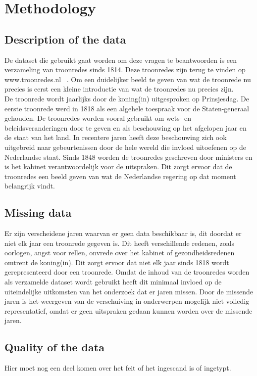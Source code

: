 \section{Methodology}
\label{sec:meth}


\subsection{Description of the data}
De dataset die gebruikt gaat worden om deze vragen te beantwoorden is een verzameling van troonredes sinds 1814. Deze troonredes zijn terug te vinden op www.troonredes.nl~\citep{troonredes} . Om een duidelijker beeld te geven van wat de troonrede nu precies is eerst een kleine introductie van wat de troonredes nu precies zijn. 
\\
De troonrede wordt jaarlijks door de koning(in) uitgesproken op Prinsjesdag. De eerste troonrede werd in 1818 als een algehele toespraak voor de Staten-generaal gehouden. De troonredes worden vooral gebruikt om wets- en beleidsveranderingen
door te geven en als beschouwing op het afgelopen jaar en de staat van het land. In recentere jaren heeft deze beschouwing zich ook uitgebreid naar gebeurtenissen door de hele wereld die invloed uitoefenen op de Nederlandse staat. Sinds 1848 worden de troonredes geschreven door ministers en is het kabinet verantwoordelijk voor de uitspraken. Dit zorgt ervoor dat de troonredes een beeld geven van wat de Nederlandse regering op dat moment belangrijk vindt.
\subsection{Missing data}
Er zijn verscheidene jaren waarvan er geen data beschikbaar is, dit doordat er niet elk jaar een troonrede gegeven is. Dit heeft verschillende redenen, zoals oorlogen, angst voor rellen, onvrede over het kabinet of gezondheidsredenen omtrent de koning(in). Dit zorgt ervoor dat niet elk jaar sinds 1818 wordt gerepresenteerd door een troonrede. Omdat de inhoud van de troonredes worden als
verzamelde dataset wordt gebruikt heeft dit minimaal invloed op de uiteindelijke uitkomsten van het onderzoek dat er jaren missen. Door de missende jaren is het weergeven van de verschuiving in onderwerpen mogelijk niet volledig representatief, omdat er geen uitspraken gedaan kunnen worden over de missende jaren.


\subsection{Quality of the data}
Hier moet nog een deel komen over het feit of het ingescand is of ingetypt.

